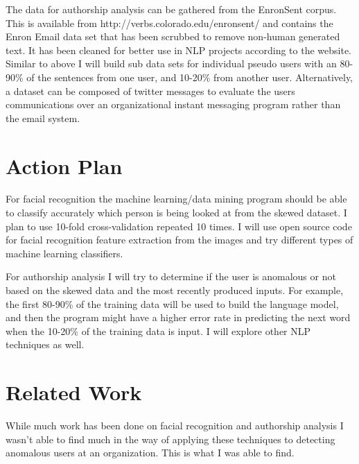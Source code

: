 \documentclass[]{article}
\begin{document}
The data for authorship analysis can be gathered from the EnronSent corpus. This is available from http://verbs.colorado.edu/enronsent/ and contains the Enron Email data set that has been scrubbed to remove non-human generated text. It has been cleaned for better use in NLP projects according to the website. Similar to above I will build sub data sets for individual pseudo users with an 80-90\% of the sentences from one user, and 10-20\% from another user. Alternatively, a dataset can be composed of twitter messages to evaluate the users communications over an organizational instant messaging program rather than the email system.

\section*{Action Plan}
For facial recognition the machine learning/data mining program should be able to classify accurately which person is being looked at from the skewed dataset. I plan to use 10-fold cross-validation repeated 10 times. I will use open source code for facial recognition feature extraction from the images and try different types of machine learning classifiers.

For authorship analysis I will try to determine if the user is anomalous or not based on the skewed data and the most recently produced inputs. For example, the first 80-90\% of the training data will be used to build the language model, and then the program might have a higher error rate in predicting the next word when the 10-20\% of the training data is input. I will explore other NLP techniques as well.



\section*{Related Work}
While much work has been done on facial recognition and authorship analysis I wasn't able to find much in the way of applying these techniques to detecting anomalous users at an organization. This is what I was able to find. 
\pagebreak
\end{document}
